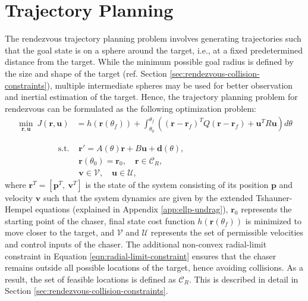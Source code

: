 \section{Trajectory Planning} \label{ssec:rendezvous-traj-planning}
The rendezvous trajectory planning problem involves generating trajectories such that the goal state is on a sphere around the target, i.e., at a fixed predetermined distance from the target.
While the minimum possible goal radius is defined by the size and shape of the target (ref. Section \ref{sec:rendezvous-collision-constraints}), multiple intermediate spheres may be used for better observation and inertial estimation of the target.
Hence, the trajectory planning problem for rendezvous can be formulated as the following optimization problem:
\begin{align}
    \min_{\boldsymbol{r}, \boldsymbol{u}}\ J(\boldsymbol{r},\boldsymbol{u})&=h(\boldsymbol{r}(\theta_f))+\int_{\theta_0}^{\theta_f} \left((\boldsymbol{r}-\boldsymbol{r}_f)^TQ(\boldsymbol{r}-\boldsymbol{r}_f)+\boldsymbol{u}^TR\boldsymbol{u}\right)d\theta
\end{align}
\addtocounter{equation}{-1}
\vspace{-4ex}
\begin{subequations}
\begin{align}
    \textrm{s.t. } & \boldsymbol{r}'=A(\theta)\boldsymbol{r}+B\boldsymbol{u}+\boldsymbol{d}(\theta),\hspace{8em}\\
    & \boldsymbol{r}(\theta_0)=\boldsymbol{r}_0,\quad\boldsymbol{r}\in{\mathcal{C}}_R,\label{eqn:radial-limit-constraint}\\
    & \boldsymbol{v}\in{\mathcal{V}},\quad\boldsymbol{u}\in{\mathcal{U}},
\end{align}
\end{subequations}
where $\boldsymbol{r}^T=\left[\boldsymbol{p}^{T},\ \boldsymbol{v}^{T}\right]$ is the state of the system consisting of its position $\boldsymbol{p}$ and velocity $\boldsymbol{v}$ such that the system dynamics are given by the extended Tshauner-Hempel equations (explained in Appendix \ref{app:ellp-undrag}), $\boldsymbol{r}_0$ represents the starting point of the chaser, final state cost function $h(\boldsymbol{r}(\theta_f))$ is minimized to move closer to the target, and ${\mathcal{V}}$ and ${\mathcal{U}}$ represents the set of permissible velocities and control inputs of the chaser.
The additional non-convex radial-limit constraint in Equation \ref{eqn:radial-limit-constraint} ensures that the chaser remains outside all possible locations of the target, hence avoiding collisions.
As a result, the set of feasible locations is defined as ${\mathcal{C}}_R$.
This is described in detail in Section \ref{sec:rendezvous-collision-constraints}.

